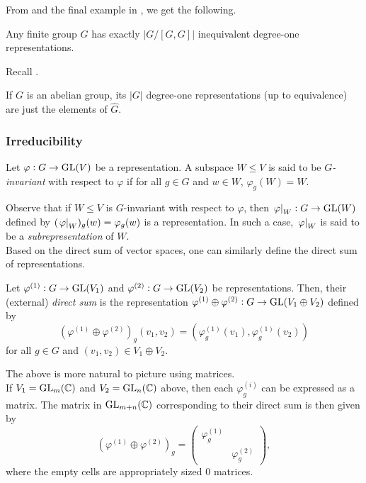 			From  and the final example in , we get the following.

			\begin{corollary}
				\label{cor: number of degree one reps}
				Any finite group $G$ has exactly $|G/[G,G]|$ inequivalent degree-one representations.
			\end{corollary}

			Recall .

			\begin{fcor}
				\label{cor: deg one reps of abelian group}
				If $G$ is an abelian group, its $|G|$ degree-one representations (up to equivalence) are just the elements of $\hat{G}$.
			\end{fcor}

		\subsubsection{Irreducibility}

			\begin{fdef}
				Let $\varphi : G \to \operatorname{GL}(V)$ be a representation. A subspace $W \le V$ is said to be \emph{$G$-invariant} with respect to $\varphi$ if for all $g \in G$ and $w \in W$, $\varphi_g(W) = W$.
			\end{fdef}

			Observe that if $W\le V$ is $G$-invariant with respect to $\varphi$, then $\left.\varphi\right|_{W} : G \to \operatorname{GL}(W)$ defined by $(\left.\varphi\right|_{W})_g(w) = \varphi_g(w)$ is a representation. In such a case, $\left.\varphi\right|_{W}$ is said to be a \emph{subrepresentation} of $W$.\\
			Based on the direct sum of vector spaces, one can similarly define the direct sum of representations.

			\begin{fdef}
				Let $\varphi^{(1)} : G \to \operatorname{GL}(V_1)$ and $\varphi^{(2)} : G \to \operatorname{GL}(V_2)$ be representations. Then, their (external) \emph{direct sum} is the representation $\varphi^{(1)} \oplus \varphi^{(2)} : G \to \operatorname{GL}(V_1 \oplus V_2)$ defined by
				\[ \left(\varphi^{(1)} \oplus \varphi^{(2)}\right)_g(v_1,v_2) = (\varphi^{(1)}_g(v_1), \varphi^{(1)}_g(v_2)) \]
				for all $g \in G$ and $(v_1,v_2) \in V_1 \oplus V_2$.
			\end{fdef}

			The above is more natural to picture using matrices.\\
			If $V_1 = \operatorname{GL}_m(\mathbb{C})$ and $V_2 = \operatorname{GL}_n(\mathbb{C})$ above, then each $\varphi^{(i)}_g$ can be expressed as a matrix. The matrix in $\operatorname{GL}_{m+n}(\mathbb{C})$ corresponding to their direct sum is then given by
			\[ \left( \varphi^{(1)} \oplus \varphi^{(2)} \right)_g = \begin{pmatrix} \varphi^{(1)}_g &  \\  & \varphi^{(2)}_g \end{pmatrix}, \]
			where the empty cells are appropriately sized $0$ matrices.\\
			
